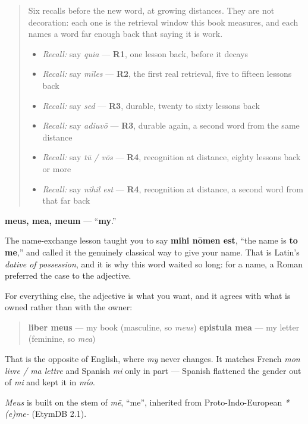 \label{lesson:LA-C52-meus}



\begin{quote}
Six recalls before the new word, at growing distances. They are not decoration: each one is the retrieval window this book measures, and each names a word far enough back that saying it is work.

\begin{itemize}
\raggedright
  \item \emph{Recall:} say \emph{quia} — \textbf{R1}, one lesson back, before it decays
  \item \emph{Recall:} say \emph{mīles} — \textbf{R2}, the first real retrieval, five to fifteen lessons back
  \item \emph{Recall:} say \emph{sed} — \textbf{R3}, durable, twenty to sixty lessons back
  \item \emph{Recall:} say \emph{adiuvō} — \textbf{R3}, durable again, a second word from the same distance
  \item \emph{Recall:} say \emph{tū / vōs} — \textbf{R4}, recognition at distance, eighty lessons back or more
  \item \emph{Recall:} say \emph{nihil est} — \textbf{R4}, recognition at distance, a second word from that far back
\end{itemize}
\end{quote}

\begin{cousinweb}
\textbf{meus, mea, meum} — \textquotedblleft{}\textbf{my}.\textquotedblright{}

The name-exchange lesson taught you to say \textbf{mihi nōmen est}, \textquotedblleft{}the name is \textbf{to me},\textquotedblright{} and called it the genuinely classical way to give your name. That is Latin's \emph{dative of possession}, and it is why this word waited so long: for a name, a Roman preferred the case to the adjective.

For everything else, the adjective is what you want, and it agrees with what is owned rather than with the owner:

\begin{quote}
\textbf{liber meus} — my book (masculine, so \emph{meus}) \textbf{epistula mea} — my letter (feminine, so \emph{mea})
\end{quote}

That is the opposite of English, where \emph{my} never changes. It matches French \emph{mon livre / ma lettre} and Spanish \emph{mi} only in part — Spanish flattened the gender out of \emph{mi} and kept it in \emph{mío}.

\emph{Meus} is built on the stem of \emph{mē}, \textquotedblleft{}me\textquotedblright{}, inherited from Proto-Indo-European \emph{*(e)me-} (EtymDB 2.1).
\end{cousinweb}

